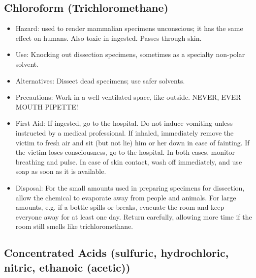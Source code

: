 \subsection{Chloroform (Trichloromethane)}

\begin{itemize}

\item{Hazard: used to render mammalian specimens unconscious; 
it has the same effect on humans. 
Also toxic in ingested. Passes through skin.}

\item{Use: Knocking out dissection specimens, 
sometimes as a specialty non-polar solvent.}

\item{Alternatives: Dissect dead specimens; 
use safer solvents.}

\item{Precautions: Work in a well-ventilated space, like outside. 
NEVER, EVER MOUTH PIPETTE!}

\item{First Aid: If ingested, go to the hospital. 
Do not induce vomiting unless instructed by a medical professional. 
If inhaled, immediately remove the victim to fresh air and sit 
(but not lie) him or her down in case of fainting. 
If the victim loses consciousness, go to the hospital. 
In both cases, monitor breathing and pulse. 
In case of skin contact, wash off immediately, 
and use soap as soon as it is available.}

\item{Disposal: For the small amounts used 
in preparing specimens for dissection, 
allow the chemical to evaporate away from people and animals. 
For large amounts, e.g. if a bottle spills or breaks, 
evacuate the room and keep everyone away for at least one day. 
Return carefully, allowing more time 
if the room still smells like trichloromethane.}

\end{itemize}

\subsection{Concentrated Acids 
(sulfuric, hydrochloric, nitric, ethanoic (acetic))}

